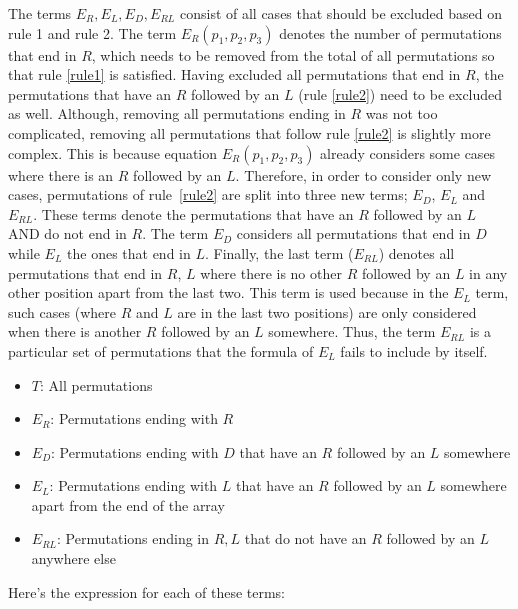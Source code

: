 The terms \(E_R, E_L, E_D, E_{RL}\) consist of all cases that should be excluded
based on rule 1 and rule 2.
The term \(E_R(p_1,p_2,p_3)\) denotes the number of permutations that end in
\(R\), which needs to be removed from the total of all permutations so that rule
\ref{rule1} is satisfied.
Having excluded all permutations that end in \(R\), the
permutations that have an \(R\) followed by an \(L\) (rule \ref{rule2}) need to
be excluded as well.
Although, removing all permutations ending in \(R\) was not too complicated,
removing all permutations that follow rule \ref{rule2} is slightly more complex.
This is because equation \(E_R(p_1,p_2,p_3)\) already considers some cases where
there is an \(R\) followed by an \(L\).
Therefore, in order to consider only new cases, permutations of rule~\ref{rule2}
are split into three new terms; \(E_D\), \(E_L\) and \(E_{RL}\).
These terms denote the permutations that have an \(R\) followed by an \(L\) AND
do not end in \(R\).
The term \(E_D\) considers all permutations that end in \(D\) while \(E_L\) the
ones that end in \(L\).
Finally, the last term (\(E_{RL}\)) denotes all permutations that end in \(R\),
\(L\) where there is no other \(R\) followed by an \(L\) in any other position
apart from the last two.
This term is used because in the \(E_L\) term, such cases (where \(R\) and \(L\)
are in the last two positions) are only considered when there is another \(R\)
followed by an \(L\) somewhere.
Thus, the term \(E_{RL}\) is a particular set of permutations that the formula
of \(E_L\) fails to include by itself.

\begin{itemize}
    \item \(T\): All permutations
    \item \(E_R\): Permutations ending with \(R\)
    \item \(E_D\): Permutations ending with \(D\) that have an \(R\) followed by
    an \(L\) somewhere
    \item \(E_L\): Permutations ending with \(L\) that have an \(R\) followed by
    an \(L\) somewhere apart from the end of the array
    \item \(E_{RL}\): Permutations ending in \(R, L\) that do not have an \(R\)
    followed by an \(L\) anywhere else
\end{itemize}


Here's the expression for each of these terms:


